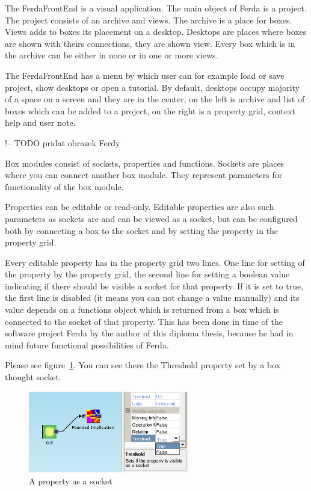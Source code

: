 \documentclass[a4paper,12pt]{book}
\begin{document}
The FerdaFrontEnd is a visual application. The main object of Ferda is a project. The project consists of an archive and views. The archive is a place for boxes. Views adds to boxes its placement on a desktop. Desktops are places where boxes are shown with theirs connections, they are shown view. Every box which is in the archive can be either in none or in one or more views.

The FerdaFrontEnd has a menu by which user can for example load or save project, show desktops or open a tutorial. By default, desktops occupy majority of a space on a screen and they are in the center, on the left is archive and list of boxes which can be added to a project, on the right is a property grid, context help and user note.

!-- TODO pridat obrazek Ferdy

Box modules consist of sockets, properties and functions. Sockets are places where you can connect another box module. They represent parameters for functionality of the box module.

Properties can be editable or read-only. Editable properties are also such parameters as sockets are and can be viewed as a socket, but can be configured both by connecting a box to the socket and by setting the property in the property grid.

Every editable property has in the property grid two lines. One line for setting of the property by the property grid, the second line for setting a boolean value indicating if there should be visible a socket for that property. If it is set to true, the first line is disabled (it means you can not change a value manually) and its value depends on a functions object which is returned from a box which is connected to the socket of that property. This has been done in time of the software project Ferda by the author of this diploma thesis, because he had in mind future functional possibilities of Ferda.

Please see figure~\ref{fig:propertyAsASocket}. You can see there the Threshold property set by a box thought socket.

\begin{figure}
	\centering
	\includegraphics[width=7cm]{property_as_socket}
	\caption{A property as a socket}
	\label{fig:propertyAsASocket}
\end{figure}
\end{document}
